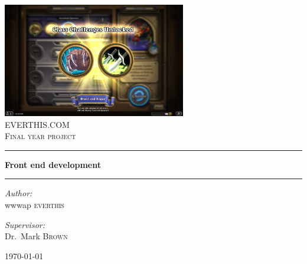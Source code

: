 \begin{titlepage}
	\begin{center}
		
		\includegraphics[width=0.6\textwidth]{graphics/hs}~\\[1cm]
		
		\textsc{\LARGE EVERTHIS.COM}\\[1.5cm]
		
		\textsc{\Large Final year project}\\[0.5cm]
		
		\rule[1pt]{\textwidth}{2pt}
		{ \huge \bfseries Front end development \\[0.5cm] }
		
		\rule[10pt]{\textwidth}{2pt}
		
		\begin{minipage}{0.4\textwidth}
			\begin{flushleft} \large
				\emph{Author:}\\
				wwwap \textsc{everthis}
			\end{flushleft}
		\end{minipage}
		\begin{minipage}{0.4\textwidth}
			\begin{flushright} \large
				\emph{Supervisor:} \\
				Dr.~Mark \textsc{Brown}
			\end{flushright}
		\end{minipage}
		
		\vfill

		{\large \today}
		
	\end{center}

\end{titlepage}
